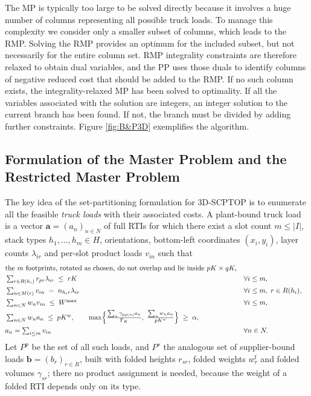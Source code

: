 The MP is typically too large to be solved directly because it
involves a huge number of columns representing all possible truck
loads. To manage this complexity we consider only a smaller subset of
columns, which leads to the RMP. Solving the RMP provides an optimum
for the included subset, but not necessarily for the entire column
set. RMP integrality constraints are therefore relaxed to obtain dual
variables, and the PP uses those duals to identify columns of
negative reduced cost that should be added to the RMP. If no such
column exists, the integrality-relaxed MP has been solved to
optimality. If all the variables associated with the solution are
integers, an integer solution to the current branch has been found.
If not, the branch must be divided by adding further constraints.
Figure \ref{fig:B&P3D} exemplifies the algorithm.



\subsection{Formulation of the Master Problem and the Restricted
Master Problem}
\label{sec:mp}

The key idea of the set-partitioning formulation for 3D-SCPTOP is to
enumerate all the feasible \emph{truck loads} with their associated
costs. A plant-bound truck load is a vector
$\mathbf{a}=(a_{n})_{n\in N}$ of full RTIs for which there exist a
slot count $m\le|I|$, stack types $h_{1},\dots,h_{m}\in H$,
orientations, bottom-left coordinates $(x_{i},y_{i})$, layer counts
$\lambda_{ir}$ and per-slot product loads $v_{in}$ such that
\begin{align}
&\text{the $m$ footprints, rotated as chosen, do not overlap and lie
   inside } pK\times qK,
   \label{eq:col-geom}\\
&\textstyle\sum_{r\in R(h_{i})} r_{pr}\lambda_{ir}\;\le\;rK
   &&\forall i\le m,
   \label{eq:col-height}\\
&\textstyle\sum_{n\in M(r)} v_{in}\;=\;n_{h_{i}r}\lambda_{ir}
   &&\forall i\le m,\;r\in R(h_{i}),
   \label{eq:col-assign}\\
&\textstyle\sum_{n\in N} w_{n}v_{in}\;\le\;W^{\max}
   &&\forall i\le m,
   \label{eq:col-crush}\\
&\textstyle\sum_{n\in N} w_{n}a_{n}\;\le\;pK^{w},
   \qquad
   \max\Bigl\{\tfrac{\sum_{n}\gamma_{p\rho(n)}a_{n}}{\Gamma_{K}},\;
              \tfrac{\sum_{n}w_{n}a_{n}}{pK^{w}}\Bigr\}\;\ge\;\alpha,
   \label{eq:col-truck}\\
&a_{n}=\textstyle\sum_{i\le m} v_{in}
   &&\forall n\in N.
   \label{eq:col-agg}
\end{align}
Let $P^{p}$ be the set of all such loads, and $P^{s}$ the analogous
set of supplier-bound loads $\mathbf{b}=(b_{r})_{r\in R}$, built with
folded heights $r_{sr}$, folded weights $w^{\mathrm{f}}_{r}$ and
folded volumes $\gamma_{sr}$; there no product assignment is needed,
because the weight of a folded RTI depends only on its type.

